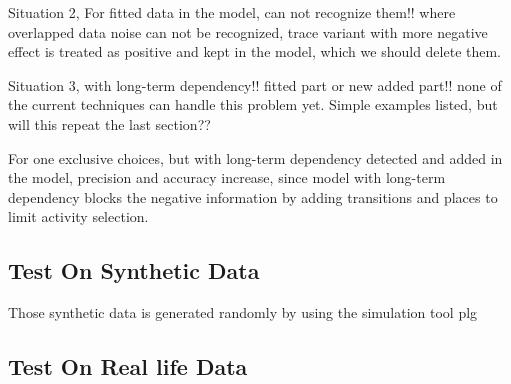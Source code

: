 Situation 2, For fitted data in the model, can not recognize them!! where overlapped data noise can not be recognized, trace variant with more negative effect is treated as positive and kept in the model, which we should delete them.   

Situation 3, with long-term dependency!! fitted part or new added part!! none of the current techniques can handle this problem yet.
Simple examples listed, but will this repeat the last section?? 


For one exclusive choices, 
but with long-term dependency detected and added in the model, precision and accuracy increase, since model with long-term dependency blocks the negative information by adding transitions and places to limit activity selection. 
\subsection{Test On Synthetic Data}
Those synthetic data is generated randomly by using the simulation tool plg %
\subsection{Test On Real life Data}
